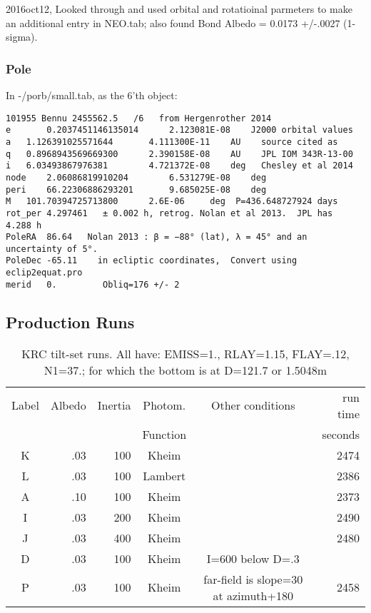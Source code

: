 \documentclass{article}
\begin{document}
2016oct12, Looked through \qcite{} and used orbital and rotatioinal parmeters to
make an additional entry in NEO.tab; also found Bond Albedo = 0.0173 +/-.0027
(1-sigma).

\subsubsection{Pole}

In -/porb/small.tab, as the 6'th object: 
\vspace{-3.mm} 
\begin{verbatim}
101955 Bennu 2455562.5   /6   from Hergenrother 2014
e       0.2037451146135014      2.123081E-08    J2000 orbital values 
a 	1.126391025571644       4.111300E-11	AU    source cited as 
q 	0.8968943569669300      2.390158E-08 	AU    JPL IOM 343R-13-00
i 	6.03493867976381        4.721372E-08	deg   Chesley et al 2014
node 	2.06086819910204        6.531279E-08	deg    
peri    66.22306886293201       9.685025E-08	deg
M 	101.70394725713800      2.6E-06 	deg  P=436.648727924 days
rot_per 4.297461   ± 0.002 h, retrog. Nolan et al 2013.  JPL has  4.288 h 
PoleRA  86.64   Nolan 2013 : β = −88° (lat), λ = 45° and an uncertainty of 5°.  
PoleDec -65.11    in ecliptic coordinates,  Convert using eclip2equat.pro 
merid   0.         Obliq=176 +/- 2
\end{verbatim}


\subsection{Production Runs}  %

\begin{table} [!h]
\caption{KRC tilt-set runs. All have: EMISS=1., RLAY=1.15, FLAY=.12, N1=37.; for which the bottom is at  D=121.7 or 1.5048m }
\label{runt}
\begin{center}
\begin{tabular}{| c  r  r  c | c | r | } \hline \hline
Label & Albedo & Inertia & Photom. & Other conditions & run time\\
       &       &        & Function &  & seconds\\  \hline
K & .03 & 100 & Kheim & & 2474 \\ 
L & .03 & 100 & Lambert & & 2386 \\   %
A & .10 & 100 & Kheim & &  2373 \\ 
I & .03 & 200 & Kheim & &  2490 \\ 
J & .03 & 400 & Kheim & & 2480 \\ 
D & .03 & 100 & Kheim & I=600 below D=.3 \\
P & .03 & 100 & Kheim & far-field is slope=30 at azimuth+180 & 2458\\ 
 \hline
\end{tabular} \end{center}
\end{table}
\end{document}

